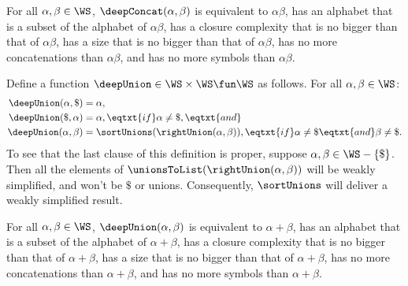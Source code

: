 \begin{lemma}
\label{DeepConcatLem}
For all $\alpha,\beta\in\WS$, $\deepConcat(\alpha,\beta)$
is equivalent to $\alpha\beta$, has an alphabet that is a
subset of the alphabet of $\alpha\beta$, has a closure complexity that
is no bigger than that of $\alpha\beta$, has a size that is no bigger
than that of $\alpha\beta$, has no more concatenations than
$\alpha\beta$, and has no more symbols than $\alpha\beta$.
\end{lemma}

Define a function $\deepUnion\in\WS\times\WS\fun\WS$ as follows.  For all
$\alpha,\beta\in\WS$:
\begin{align*}
  \deepUnion(\alpha, \$) &= \alpha , \\
  \deepUnion(\$, \alpha) &= \alpha , \eqtxt{if} \alpha\neq\$ , \eqtxt{and} \\
  \deepUnion(\alpha, \beta) &=
    \sortUnions(\rightUnion(\alpha, \beta)), \eqtxt{if} \alpha\neq\$
    \eqtxt{and} \beta\neq\$ .
\end{align*}
To see that the last clause of this definition is proper, suppose
$\alpha,\beta\in\WS-\{\$\}$.  Then all the elements of
$\unionsToList(\rightUnion(\alpha,\beta))$ will be weakly simplified,
and won't be $\$$ or unions.  Consequently, $\sortUnions$ will
deliver a weakly simplified result.

\begin{lemma}
\label{DeepUnionLem}
For all $\alpha,\beta\in\WS$, $\deepUnion(\alpha,\beta)$
is equivalent to $\alpha+\beta$, has an alphabet that is a
subset of the alphabet of $\alpha+\beta$, has a closure complexity
that is no bigger than that of $\alpha+\beta$, has a size that is no
bigger than that of $\alpha+\beta$, has no more concatenations than
$\alpha+\beta$, and has no more symbols than $\alpha+\beta$.
\end{lemma}

